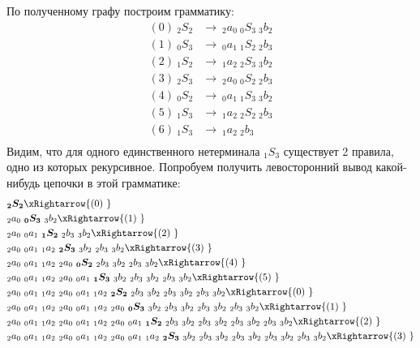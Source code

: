 \begin{example}
	По полученному графу построим грамматику:
	\begin{align*}
	    (0)\ _2S_2   &\to\ _2a_0\ _0S_3\ _3b_2 \\ 
	    (1)\ _0S_3   &\to\ _0a_1\ _1S_2\ _2b_3 \\
	    (2)\ _1S_2   &\to\ _1a_2\ _2S_3\ _3b_2 \\ 
	    (3)\ _2S_3   &\to\ _2a_0\ _0S_2\ _2b_3 \\ 
	    (4)\ _0S_2   &\to\ _0a_1\ _1S_3\ _3b_2 \\ 
	    (5)\ _1S_3   &\to\ _1a_2\ _2S_2\ _2b_3 \\ 
	    (6)\ _1S_3   &\to\ _1a_2\ _2b_3 \\ 
	\end{align*}
	Видим, что для одного единственного нетерминала $_1S_3$ существует 2 правила, одно из которых рекурсивное. Попробуем получить левосторонний вывод какой-нибудь цепочки в этой грамматике: 
    \begin{align*}
        & \boldsymbol{_2S_2} \xRightarrow{(0)\ } \\
    	& {_2a_0}\ \boldsymbol{_0S_3}\ {_3b_2} \xRightarrow{(1)\ } \\
    	& {_2a_0}\ {_0a_1}\ \boldsymbol{_1S_2}\ {_2b_3}\ {_3b_2} \xRightarrow{(2)\ } \\
    	& {_2a_0}\ {_0a_1}\ {_1a_2}\ \boldsymbol{_2S_3}\ {_3b_2}\ {_2b_3}\ {_3b_2} \xRightarrow{(3)\ } \\
    	& {_2a_0}\ {_0a_1}\ {_1a_2}\ {_2a_0}\ \boldsymbol{_0S_2}\ {_2b_3}\ {_3b_2}\ {_2b_3}\ {_3b_2} \xRightarrow{(4)\ } \\
    	& {_2a_0}\ {_0a_1}\ {_1a_2}\ {_2a_0}\ {_0a_1}\ \boldsymbol{_1S_3}\ {_3b_2}\ {_2b_3}\ {_3b_2}\ {_2b_3}\ {_3b_2} \xRightarrow{(5)\ } \\
    	& {_2a_0}\ {_0a_1}\ {_1a_2}\ {_2a_0}\ {_0a_1}\ {_1a_2}\ \boldsymbol{_2S_2}\ {_2b_3}\ {_3b_2}\ {_2b_3}\ {_3b_2}\ {_2b_3}\ {_3b_2} \xRightarrow{(0)\ } \\
    	& {_2a_0}\ {_0a_1}\ {_1a_2}\ {_2a_0}\ {_0a_1}\ {_1a_2}\ {_2a_0}\ \boldsymbol{_0S_3}\ {_3b_2}\ {_2b_3}\ {_3b_2}\ {_2b_3}\ {_3b_2}\ {_2b_3}\ {_3b_2} \xRightarrow{(1)\ } \\
    	& {_2a_0}\ {_0a_1}\ {_1a_2}\ {_2a_0}\ {_0a_1}\ {_1a_2}\ {_2a_0}\ {_0a_1}\ \boldsymbol{_1S_2}\ {_2b_3}\ {_3b_2}\ {_2b_3}\ {_3b_2}\ {_2b_3}\ {_3b_2}\ {_2b_3}\ {_3b_2} \xRightarrow{(2)\ } \\
    	& {_2a_0}\ {_0a_1}\ {_1a_2}\ {_2a_0}\ {_0a_1}\ {_1a_2}\ {_2a_0}\ {_0a_1}\ {_1a_2}\ \boldsymbol{_2S_3}\ {_3b_2}\ {_2b_3}\ {_3b_2}\ {_2b_3}\ {_3b_2}\ {_2b_3}\ {_3b_2}\ {_2b_3}\ {_3b_2} \xRightarrow{(3)\ } \\

\end{align*}
\end{example}
